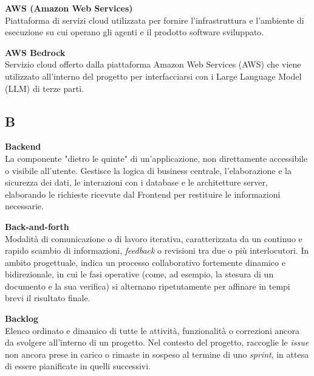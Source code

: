 \documentclass[12pt, a4paper]{article}
\begin{document}
\newpage
\noindent\hypertarget{aws}{\textbf{AWS (Amazon Web Services)}} \\[0.1em]
Piattaforma di servizi cloud utilizzata per fornire l'infrastruttura e l'ambiente di esecuzione su cui operano gli agenti e il prodotto software sviluppato.
\vspace{0.1cm}

\noindent\hypertarget{aws-bedrock}{\textbf{AWS Bedrock}} \\[0.1em]
Servizio cloud offerto dalla piattaforma Amazon Web Services (AWS) che viene utilizzato all'interno del progetto per interfacciarsi con i Large Language Model (LLM) di terze parti.
\vspace{0.5cm}  

\newpage
\subsection*{B}
{}
\vspace{0.2cm}

\noindent\hypertarget{backend}{\textbf{Backend}} \\[0.1em]
La componente "dietro le quinte" di un'applicazione, non direttamente accessibile o visibile all'utente. Gestisce la logica di business centrale, l'elaborazione e la sicurezza dei dati, le interazioni con i database e le architetture server, elaborando le richieste ricevute dal Frontend per restituire le informazioni necessarie.
\vspace{0.5cm}

\noindent\hypertarget{back-and-forth}{\textbf{Back-and-forth}} \\[0.1em]
Modalità di comunicazione o di lavoro iterativa, caratterizzata da un continuo e rapido scambio di informazioni, \textit{feedback} o revisioni tra due o più interlocutori. In ambito progettuale, indica un processo collaborativo fortemente dinamico e bidirezionale, in cui le fasi operative (come, ad esempio, la stesura di un documento e la sua verifica) si alternano ripetutamente per affinare in tempi brevi il risultato finale.
\vspace{0.5cm}

\noindent\hypertarget{backlog}{\textbf{Backlog}} \\[0.1em]
Elenco ordinato e dinamico di tutte le attività, funzionalità o correzioni ancora da svolgere all’interno di un progetto. Nel contesto del progetto, raccoglie le \textit{issue} non ancora prese in carico o rimaste in sospeso al termine di uno \textit{sprint}, in attesa di essere pianificate in quelli successivi.
\vspace{0.5cm}
\end{document}
